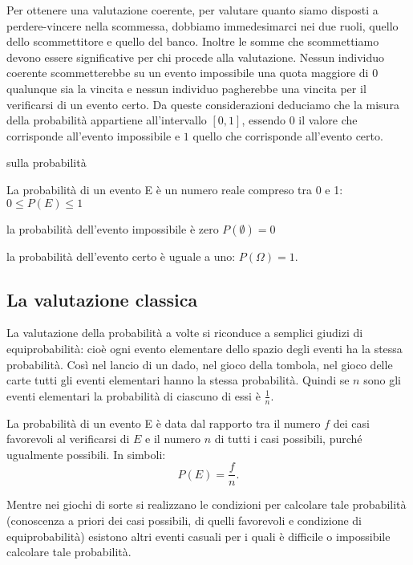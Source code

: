 Per ottenere una valutazione coerente, per valutare quanto siamo disposti a 
perdere-vincere nella scommessa, dobbiamo immedesimarci nei due ruoli, quello 
dello scommettitore e quello del banco. Inoltre le somme che scommettiamo devono 
essere significative per chi procede alla valutazione.
Nessun individuo coerente scommetterebbe su un evento impossibile una quota 
maggiore di 0 qualunque sia la vincita e nessun individuo pagherebbe una vincita 
per il verificarsi di un evento certo.
Da queste considerazioni deduciamo che la misura della probabilità appartiene 
all'intervallo $[0,1]$, essendo $ 0 $ il valore che corrisponde all'evento 
impossibile e $1$ quello che corrisponde all'evento certo.

% 
% 
% 
% 
\begin{definizione}{sulla probabilità}

La probabilità di un evento E è un numero reale compreso tra 0 e 1: $0\le 
P(E)\le 1$

la probabilità dell'evento impossibile è zero $P(\emptyset )=0$

la probabilità dell'evento certo è uguale a uno: $P(\Omega )=1$.
\end{definizione}

\subsection{La valutazione classica}

La valutazione della probabilità a volte si riconduce a semplici giudizi di 
equiprobabilità: cioè ogni evento elementare dello spazio degli eventi ha la 
stessa probabilità. Così nel lancio di un dado, nel gioco della tombola, nel 
gioco delle carte tutti gli eventi elementari hanno la stessa probabilità. 
Quindi se $n$ sono gli eventi elementari la probabilità di ciascuno di essi è 
$\frac 1 n$.

La probabilità di un evento E è data dal rapporto tra il numero $f$ dei casi 
favorevoli al verificarsi di $E$ e il numero $n$ di tutti i casi possibili, 
purché ugualmente possibili. In simboli: \[ P(E)=\dfrac f n. \]

Mentre nei giochi di sorte si realizzano le condizioni per calcolare tale 
probabilità (conoscenza a priori dei casi possibili, di quelli favorevoli e 
condizione di equiprobabilità) esistono altri eventi casuali per i quali è 
difficile o impossibile calcolare tale probabilità.

